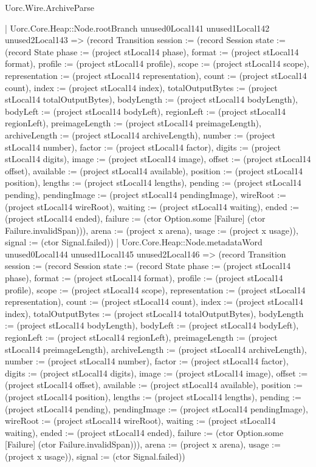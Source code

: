 \begin{lexlean}{Uorc.Wire.ArchiveParse}
\begin{semanticmodule}
{            | Uorc.Core.Heap::Node.rootBranch unused0Local141 unused1Local142 unused2Local143 => (record Transition {session := (record Session {state := (record State {phase := (project stLocal14 phase), format := (project stLocal14 format), profile := (project stLocal14 profile), scope := (project stLocal14 scope), representation := (project stLocal14 representation), count := (project stLocal14 count), index := (project stLocal14 index), totalOutputBytes := (project stLocal14 totalOutputBytes), bodyLength := (project stLocal14 bodyLength), bodyLeft := (project stLocal14 bodyLeft), regionLeft := (project stLocal14 regionLeft), preimageLength := (project stLocal14 preimageLength), archiveLength := (project stLocal14 archiveLength), number := (project stLocal14 number), factor := (project stLocal14 factor), digits := (project stLocal14 digits), image := (project stLocal14 image), offset := (project stLocal14 offset), available := (project stLocal14 available), position := (project stLocal14 position), lengths := (project stLocal14 lengths), pending := (project stLocal14 pending), pendingImage := (project stLocal14 pendingImage), wireRoot := (project stLocal14 wireRoot), waiting := (project stLocal14 waiting), ended := (project stLocal14 ended), failure := (ctor Option.some [Failure] (ctor Failure.invalidSpan))}), arena := (project x arena), usage := (project x usage)}), signal := (ctor Signal.failed)})
            | Uorc.Core.Heap::Node.metadataWord unused0Local144 unused1Local145 unused2Local146 => (record Transition {session := (record Session {state := (record State {phase := (project stLocal14 phase), format := (project stLocal14 format), profile := (project stLocal14 profile), scope := (project stLocal14 scope), representation := (project stLocal14 representation), count := (project stLocal14 count), index := (project stLocal14 index), totalOutputBytes := (project stLocal14 totalOutputBytes), bodyLength := (project stLocal14 bodyLength), bodyLeft := (project stLocal14 bodyLeft), regionLeft := (project stLocal14 regionLeft), preimageLength := (project stLocal14 preimageLength), archiveLength := (project stLocal14 archiveLength), number := (project stLocal14 number), factor := (project stLocal14 factor), digits := (project stLocal14 digits), image := (project stLocal14 image), offset := (project stLocal14 offset), available := (project stLocal14 available), position := (project stLocal14 position), lengths := (project stLocal14 lengths), pending := (project stLocal14 pending), pendingImage := (project stLocal14 pendingImage), wireRoot := (project stLocal14 wireRoot), waiting := (project stLocal14 waiting), ended := (project stLocal14 ended), failure := (ctor Option.some [Failure] (ctor Failure.invalidSpan))}), arena := (project x arena), usage := (project x usage)}), signal := (ctor Signal.failed)})
}
\end{semanticmodule}
\end{lexlean}
